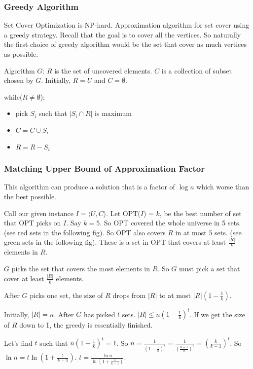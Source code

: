 \subsubsection{Greedy Algorithm}
Set Cover Optimization is NP-hard. Approximation algorithm for set cover using a greedy strategy. Recall that the goal is to cover all the vertices. So naturally the first choice of greedy algorithm would be the set that cover as much vertices as possible.

Algorithm $G$:
$R$ is the set of uncovered elements. $C$ is a collection of subset chosen by $G$. Initially, $R = U$ and $C = \emptyset$.

while($R \neq \emptyset$):
\begin{itemize}
	\item pick $S_i$ such that $|S_i \cap R|$ is maximum
	\item $C = C \cup {S_i}$
	\item $R = R - S_i$
\end{itemize}

\subsubsection{Matching Upper Bound of Approximation Factor}
This algorithm can produce a solution that is a factor of $\log n$ which worse than the best possible.

Call our given instance $I = \langle U, C \rangle$. Let OPT($I$) = $k$, be the best number of set that OPT picks on $I$. Say $k = 5$. So OPT covered the whole universe in 5 sets. (see red sets in the following fig). So OPT also covers $R$ in at most 5 sets. (see green sets in the following fig). These is a set in OPT that covers at least $\frac{|R|}{k}$ elements in $R$.

$G$ picks the set that covers the most elements in $R$. So $G$ must pick a set that cover at least $\frac{|R|}{k}$ elements.

After $G$ picks one set, the size of $R$ drops from $|R|$ to at most $|R|(1 - \frac{1}{k})$.

Initially, $|R| = n$. After $G$ has picked $t$ sets. $|R| \le n (1 - \frac{1}{k})^t$. If we get the size of $R$ down to 1, the greedy is essentially finished.

Let's find $t$ such that $n ( 1 - \frac{1}{k})^t = 1$. So $n = \frac{1}{(1 - \frac{1}{k})^t} = \frac{1}{(\frac{k-1}{k})^t} = (\frac{k}{k-1})^t$. So $\ln n = t \ln (1 + \frac{1}{k-1})$. $t = \frac{\ln n}{\ln(1 + \frac{1}{k - 1})}$.

